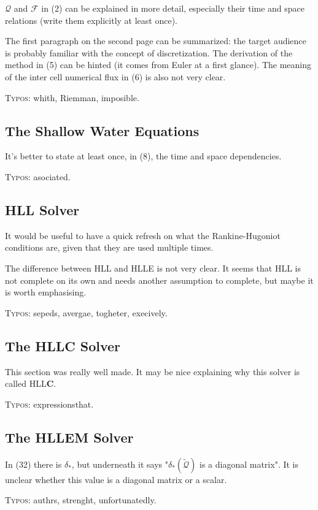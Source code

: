 \documentclass{scrartcl}
\begin{document}
$\mathcal{Q}$ and $\mathcal{F}$ in (2) can be explained in more detail, especially their time and space relations (write them explicitly at least once).

The first paragraph on the second page can be summarized: the target audience is probably familiar with the concept of discretization. The derivation of the method in (5) can be hinted (it comes from Euler at a first glance). The meaning of the inter cell numerical flux in (6) is also not very clear.

\textsc{Typos}: whith, Riemman, imposible.

\subsection{The Shallow Water Equations}

It's better to state at least once, in (8), the time and space dependencies.

\textsc{Typos}: asociated.

\subsection{HLL Solver}

It would be useful to have a quick refresh on what the Rankine-Hugoniot conditions are, given that they are used multiple times. 

The difference between HLL and HLLE is not very clear. It seems that HLL is not complete on its own and needs another assumption to complete, but maybe it is worth emphasising. 

\textsc{Typos}: sepeds, avergae, togheter, execively.

\subsection{The HLLC Solver}

This section was really well made. It may be nice explaining why this solver is called HLL\textbf{C}.

\textsc{Typos}: expressionsthat.

\subsection{The HLLEM Solver}

In (32) there is $\delta_*$, but underneath it says "$\delta_*(\tilde{\mathcal{Q}})$ is a diagonal matrix". It is unclear whether this value is a diagonal matrix or a scalar.

\textsc{Typos}: authrs, strenght, unfortunatedly.
\end{document}
